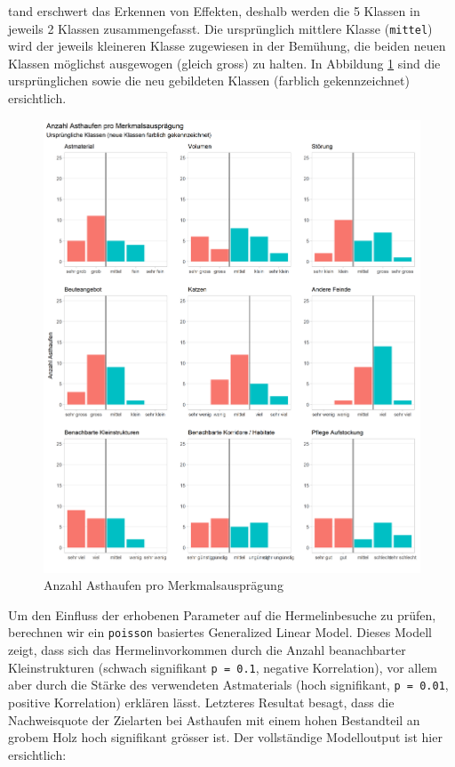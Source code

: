 \documentclass[
  oneside]{scrbook}
\begin{document}
tand erschwert das Erkennen von Effekten, deshalb werden die 5 Klassen in jeweils 2 Klassen zusammengefasst. Die ursprünglich mittlere Klasse (\texttt{mittel}) wird der jeweils kleineren Klasse zugewiesen in der Bemühung, die beiden neuen Klassen möglichst ausgewogen (gleich gross) zu halten. In Abbildung \ref{fig:asthaufenqualcount} sind die ursprünglichen sowie die neu gebildeten Klassen (farblich gekennzeichnet) ersichtlich.

\begin{figure}
\includegraphics[width=41in]{images/asthaufen_qualitaet_histogramm} \caption{Anzahl Asthaufen pro Merkmalsausprägung}\label{fig:asthaufenqualcount}
\end{figure}

Um den Einfluss der erhobenen Parameter auf die Hermelinbesuche zu prüfen, berechnen wir ein \texttt{poisson} basiertes Generalized Linear Model. Dieses Modell zeigt, dass sich das Hermelinvorkommen durch die Anzahl beanachbarter Kleinstrukturen (schwach signifikant \texttt{p\ =\ 0.1}, negative Korrelation), vor allem aber durch die Stärke des verwendeten Astmaterials (hoch signifikant, \texttt{p\ =\ 0.01}, positive Korrelation) erklären lässt. Letzteres Resultat besagt, dass die Nachweisquote der Zielarten bei Asthaufen mit einem hohen Bestandteil an grobem Holz hoch signifikant grösser ist.
Der vollständige Modelloutput ist hier ersichtlich:
\end{document}
